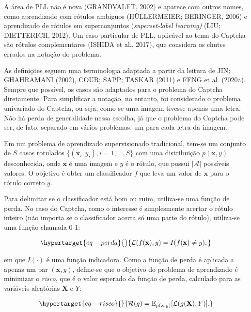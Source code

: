 \documentclass[12pt,twoside,brazilian]{book}
\begin{document}
A área de PLL não é nova (GRANDVALET, 2002) e aparece com outros nomes,
como aprendizado com rótulos ambiguos (HÜLLERMEIER; BERINGER, 2006) e
aprendizado de rótulos em superconjuntos (\emph{superset-label
learning)} (LIU; DIETTERICH, 2012). Um caso particular de PLL, aplicável
ao tema do Captcha são rótulos complementares (ISHIDA et al., 2017), que
considera os chutes errados na notação do problema.

As definições seguem uma terminologia adaptada a partir da leitura de
JIN; GHAHRAMANI (2002), COUR; SAPP; TASKAR (2011) e FENG et al. (2020a).
Sempre que possível, os casos são adaptados para o problema do Captcha
diretamente. Para simplificar a notação, no entanto, foi considerado o
problema univariado do Captcha, ou seja, como se uma imagem tivesse
apenas uma letra. Não há perda de generalidade nessa escolha, já que o
problema do Captcha pode ser, de fato, separado em vários problemas, um
para cada letra da imagem.

Em um problema de aprendizado supervisionado tradicional, tem-se um
conjunto de \(S\) casos rotulados
\(\{(\mathbf x_i,y_i), i=1,\dots, S\}\) com uma distribuição
\(p(\mathbf x,y)\) desconhecida, onde \(\mathbf x\) é uma imagem e \(y\)
é o rótulo, que possui \(|\mathcal A|\) possíveis valores. O objetivo é
obter um classificador \(f\) que leva um valor de \(\mathbf x\) para o
rótulo correto \(y\).

Para delimitar se o classificador está bom ou ruim, utiliza-se uma
função de perda. No caso do Captcha, como o interesse é simplesmente
acertar o rótulo inteiro (não importa se o classificador acerta só uma
parte do rótulo), utiliza-se uma função chamada 0-1:

\begin{equation}\protect\hypertarget{eq-perda}{}{
\mathcal L(f(\mathbf x),y) = I (f(\mathbf x) \neq y),
}\label{eq-perda}\end{equation}

em que \(I(\cdot)\) é uma função indicadora. Como a função de perda é
aplicada a apenas um par \((\mathbf x,y)\), define-se que o objetivo do
problema de aprendizado é minimizar o \emph{risco}, que é o valor
esperado da função de perda, calculado para as variáveis aleatórias
\(\mathbf X\) e \(Y\):

\begin{equation}\protect\hypertarget{eq-risco}{}{
\mathcal R(g) = \mathbb E_{p(\mathbf x,y)}[\mathcal L(g(\mathbf X),Y)].
}\label{eq-risco}\end{equation}
\end{document}
